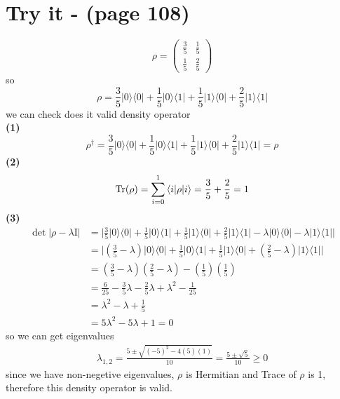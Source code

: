 \documentclass{article}
\newcommand{\op}[2]{|#1\rangle \langle#2|}
\newcommand{\sand}[3]{\braket{#1 | #2 | #3}}
\begin{document}
\section*{Try it - (page 108)}
\begin{equation*}
   \rho =  
   \begin{pmatrix}
      \displaystyle\frac{3}{5} & \displaystyle\frac{1}{5} \\[1em]
      \displaystyle\frac{1}{5} & \displaystyle\frac{2}{5}
   \end{pmatrix}
\end{equation*}
so
\begin{equation*}
   \rho = \frac{3}{5}\op{0}{0} + \frac{1}{5}\op{0}{1} + \frac{1}{5}\op{1}{0} + \frac{2}{5}\op{1}{1}
\end{equation*}
we can check does it valid density operator \\
\textbf{(1)}
\begin{equation*}
   \rho^\dagger = \frac{3}{5}\op{0}{0} + \frac{1}{5}\op{0}{1} + \frac{1}{5}\op{1}{0} + \frac{2}{5}\op{1}{1} = \rho
\end{equation*}
\textbf{(2)}
\begin{equation*}
   \text{Tr}(\rho) = \sum_{i=0}^{1} \sand{i}{\rho}{i}  = \frac{3}{5} + \frac{2}{5} = 1
\end{equation*}
\textbf{(3)}
\begin{align*}
   \det |\rho - \lambda\text{I}| &= \bigg|\frac{3}{5}\op{0}{0} + \frac{1}{5}\op{0}{1} + \frac{1}{5}\op{1}{0} + \frac{2}{5}\op{1}{1} - \lambda\op{0}{0} - \lambda\op{1}{1}\bigg| \\
   &=  \bigg|(\frac{3}{5} - \lambda)\op{0}{0} + \frac{1}{5}\op{0}{1} + \frac{1}{5}\op{1}{0} + (\frac{2}{5} - \lambda)\op{1}{1}\bigg| \\
   &= (\frac{3}{5} - \lambda)(\frac{2}{5} - \lambda) - (\frac{1}{5})(\frac{1}{5}) \\
   &= \frac{6}{25} - \frac{3}{5}\lambda - \frac{2}{5}\lambda + \lambda^2 - \frac{1}{25} \\
   &=  \lambda^2 - \lambda + \frac{1}{5} \\
   &=  5\lambda^2 - 5\lambda + 1 = 0
\end{align*}
so we can get eigenvalues
\begin{align*}
   \lambda_{1,2} = \frac{5 \pm \sqrt{(-5)^2 - 4(5)(1)}}{10} = \frac{5 \pm \sqrt{5}}{10} \ge 0
\end{align*}
since we have non-negetive eigenvalues, $\rho$ is Hermitian and Trace of $\rho$ is 1, therefore this density operator is valid.
\end{document}
